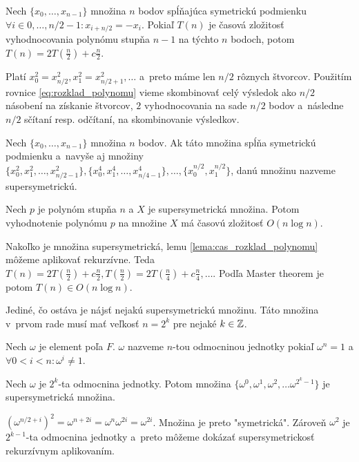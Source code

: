\begin{lema}
  Nech $\{x_0, \dots, x_{n-1}\}$ množina $n$ bodov spĺňajúca symetrickú
  podmienku $\forall i \in 0,\dots,n/2-1: x_{i+n/2}=-x_i $.
  Pokiaľ $T(n)$ je časová zložitosť vyhodnocovania polynómu stupňa
  $n-1$ na týchto $n$ bodoch, potom
  $T(n) = 2 T(\frac{n}{2}) + c \frac{n}{2}$.
  \label{lema:cas_rozklad_polynomu}
\end{lema}
\begin{dokaz}
  Platí $x_0^2 = x_{n/2}^2, x_1^2 = x_{n/2+1}^2, \dots$ a~preto
  máme len $n/2$ rôznych štvorcov. Použitím rovnice
  \eqref{eq:rozklad_polynomu} vieme skombinovať celý výsledok ako
  $n/2$ násobení na získanie štvorcov,  $2$ vyhodnocovania na sade $n/2$
  bodov a~následne $n/2$ sčítaní resp. odčítaní, na skombinovanie
  výsledkov.
\end{dokaz}

\begin{definicia}
  Nech $\{x_0, \dots, x_{n-1}\}$ množina $n$ bodov.
  Ak táto množina spĺňa symetrickú podmienku a~navyše aj množiny
  $\{x_0^2, x_1^2, \dots, x_{n/2-1}^2 \},
   \{x_0^4, x_1^4, \dots, x_{n/4-1}^4\}, \dots, \{x_0^{n/2},
   x_1^{n/2}\}$, danú množinu nazveme supersymetrickú.
\end{definicia}

\begin{lema}
    Nech $p$ je polynóm stupňa $n$ a $X$ je supersymetrická množina.
    Potom vyhodnotenie polynómu $p$ na množine $X$ má časovú zložitosť
    $O(n\log n)$.
\end{lema}
\begin{dokaz}
  Nakoľko je množina supersymetrická, lemu
  \ref{lema:cas_rozklad_polynomu} môžeme aplikovať rekurzívne.
  Teda
  $T(n) = 2 T(\frac{n}{2}) + c \frac{n}{2},
   T(\frac{n}{2}) = 2 T(\frac{n}{4}) + c \frac{n}{4}, \dots$.
  Podľa Master theorem je potom $T(n) \in O(n\log n)$.
\end{dokaz}

Jediné, čo ostáva je nájsť nejakú supersymetrickú množinu. Táto
množina v~prvom rade musí mať veľkosť $n=2^k$ pre nejaké $k\in\mathbb{Z}$.

\begin{definicia}
  Nech $\omega$ je element poľa $F$. $\omega$ nazveme $n$-tou
  odmocninou jednotky pokiaľ
   $ \omega^n = 1$ a $ \forall 0<i<n: \omega^i\not=1$.
\end{definicia}

\begin{lema}
 Nech $\omega$ je $2^k$-ta odmocnina jednotky.
 Potom množina $\{\omega^0, \omega^1, \omega^2, \dots
 \omega^{2^k-1}\}$ je supersymetrická množina.
\end{lema}
\begin{dokaz}
 $(\omega^{n/2+i})^2 = \omega^{n+2i} = \omega^n \omega^{2i} =
 \omega^{2i}$. Množina je preto "symetrická". Zároveň
 $\omega^2$ je  $2^{k-1}$-ta odmocnina jednotky a~preto
 môžeme dokázať supersymetrickosť rekurzívnym aplikovaním.
\end{dokaz}

